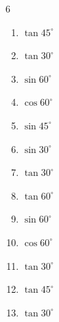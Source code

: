 \begin{multicols}{6}
\begin{enumerate}
  \item $\displaystyle \tan{45^\circ}$

        \phantom{$\displaystyle =1$}

  \item $\displaystyle \tan{30^\circ}$


  \item $\displaystyle \sin{60^\circ}$


  \item $\displaystyle \cos{60^\circ}$


  \item $\displaystyle \sin{45^\circ}$


  \item $\displaystyle \sin{30^\circ}$


  \item $\displaystyle \tan{30^\circ}$


  \item $\displaystyle \tan{60^\circ}$


  \item $\displaystyle \sin{60^\circ}$


  \item $\displaystyle \cos{60^\circ}$


\columnbreak %

  \item $\displaystyle \tan{30^\circ}$


  \item $\displaystyle \tan{45^\circ}$

        \phantom{$\displaystyle =1$}

  \item $\displaystyle \tan{30^\circ}$


\end{enumerate}
\end{multicols}

